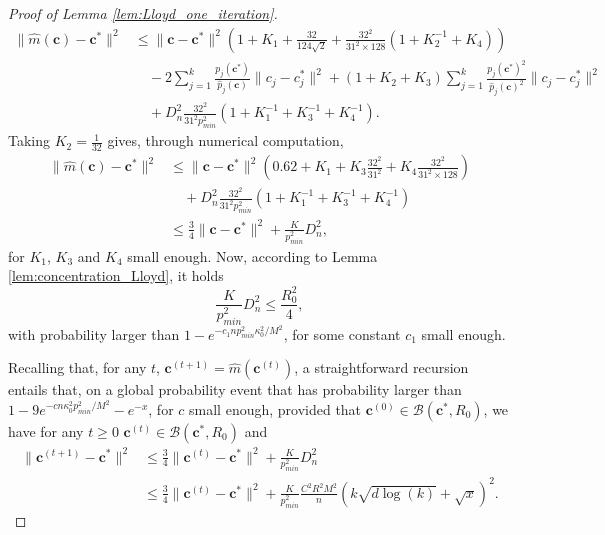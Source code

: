 \documentclass[noinfoline,preprint]{article}
\newcommand{\cb}{\mathbf{c}}
\renewcommand{\1}{\mathds 1}
\newcommand{\B}{\mathcal{B}}
\begin{document}
\begin{proof}[Proof of Lemma \ref{lem:Lloyd_one_iteration}]
\begin{align*}
\| \hat{m}(\cb) - \cb^*\|^2 & \leq \| \cb - \cb^*\|^2 \left ( 1 + K_1 + \frac{32}{124\sqrt{2}} + \frac{32^2}{31^2 \times 128} \left (1 + K_2^{-1} + K_4 \right ) \right ) \\
& \quad -2 \sum_{j=1}^{k} \frac{p_j(\cb^*)}{\hat{p}_j(\cb)} \| c_j-c_j^*\|^2 + \left ( 1 + K_2 + K_3 \right ) \sum_{j=1}^{k} \frac{p_j(\cb^*)^2}{\hat{p}_j(\cb)^2}\| c_j - c_j^*\|^2 \\
& \quad + D_n^2\frac{32^2}{31^2 p_{min}^2} \left ( 1+ K_1^{-1}   + K_3^{-1} + K_4^{-1} \right ). 
\end{align*}
Taking $K_2 = \frac{1}{32}$ gives, through numerical computation,
\begin{align*}
\| \hat{m}(\cb) - \cb^*\|^2 & \leq \| \cb-\cb^*\|^2 \left ( 0.62 + K_1 + K_3 \frac{32^2}{31^2} + K_4 \frac{32^2}{31^2 \times 128} \right ) \\
& \quad + D_n^2\frac{32^2}{31^2 p_{min}^2} \left ( 1+ K_1^{-1}   + K_3^{-1} + K_4^{-1} \right ) \\
& \leq \frac{3}{4}\| \cb - \cb^*\|^2 + \frac{K}{p_{min}^2}D_n^2,
\end{align*}
for $K_1$, $K_3$ and $K_4$ small enough.
Now, according to Lemma \ref{lem:concentration_Lloyd}, it holds
\[
\frac{K}{p_{min}^2}D_n^2 \leq \frac{R_0^2}{4},
\]
with probability larger than $1-e^{-{c_1 n p_{min}^2 \kappa_0^2/M^2 }}$, for some constant $c_1$ small enough.

Recalling that, for any $t$, $\cb^{(t+1)} = \hat{m}(\cb^{(t)})$, a straightforward recursion entails that, on a global probability event that has probability larger than $1-9e^{-cn \kappa_0^2 p_{min}^2/M^2}-e^{-x}$, for $c$ small enough, provided that $\cb^{(0)} \in \B(\cb^*,R_0)$, we have for any $t \geq 0$ $\cb^{(t)} \in \B(\cb^*,R_0)$ and 
\begin{align*}
\| \cb^{(t+1)} - \cb^*\| ^2 & \leq \frac{3}{4} \|\cb^{(t)} - \cb^*\|^2 + \frac{K}{p_{min}^2} D_n^2 \\
       & \leq \frac{3}{4} \|\cb^{(t)} - \cb^*\|^2 + \frac{K}{p_{min}^2} \frac{C^2 R^2 M^2}{n}  \left (k \sqrt{d\log(k)}+ \sqrt{x} \right )^2.
\end{align*}
\end{proof}
\end{document}
